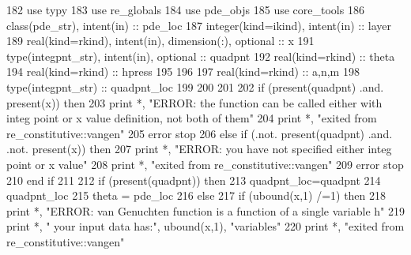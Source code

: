 \begin{DoxyCode}
182       \textcolor{keywordtype}{use }typy
183       \textcolor{keywordtype}{use }re_globals
184       \textcolor{keywordtype}{use }pde_objs
185       \textcolor{keywordtype}{use }core_tools
186       \textcolor{keywordtype}{class}(pde_str), \textcolor{keywordtype}{intent(in)} :: pde\_loc
187       \textcolor{keywordtype}{integer(kind=ikind)}, \textcolor{keywordtype}{intent(in)} :: layer
189       \textcolor{keywordtype}{real(kind=rkind)}, \textcolor{keywordtype}{intent(in)}, \textcolor{keywordtype}{dimension(:)}, \textcolor{keywordtype}{optional} :: x
191       \textcolor{keywordtype}{type}(integpnt_str), \textcolor{keywordtype}{intent(in)}, \textcolor{keywordtype}{optional} :: quadpnt
192       \textcolor{keywordtype}{real(kind=rkind)} :: theta
194       \textcolor{keywordtype}{real(kind=rkind)} :: hpress
195       
196       
197       \textcolor{keywordtype}{real(kind=rkind)} :: a,n,m
198       \textcolor{keywordtype}{type}(integpnt_str) :: quadpnt\_loc
199       
200  
201 
202       \textcolor{keywordflow}{if} (\textcolor{keyword}{present}(quadpnt) .and. \textcolor{keyword}{present}(x)) \textcolor{keywordflow}{then}
203         print *, \textcolor{stringliteral}{"ERROR: the function can be called either with integ point or x value definition, not both
       of them"}
204         print *, \textcolor{stringliteral}{"exited from re\_constitutive::vangen"}
205         error stop
206       \textcolor{keywordflow}{else} \textcolor{keywordflow}{if} (.not. \textcolor{keyword}{present}(quadpnt) .and. .not. \textcolor{keyword}{present}(x)) \textcolor{keywordflow}{then}
207         print *, \textcolor{stringliteral}{"ERROR: you have not specified either integ point or x value"}
208         print *, \textcolor{stringliteral}{"exited from re\_constitutive::vangen"}
209         error stop
210 \textcolor{keywordflow}{      end if}
211       
212       \textcolor{keywordflow}{if} (\textcolor{keyword}{present}(quadpnt)) \textcolor{keywordflow}{then}
213         quadpnt\_loc=quadpnt
214         quadpnt\_loc%
215         theta = pde\_loc%
216       \textcolor{keywordflow}{else}
217         \textcolor{keywordflow}{if} (ubound(x,1) /=1) \textcolor{keywordflow}{then}
218           print *, \textcolor{stringliteral}{"ERROR: van Genuchten function is a function of a single variable h"}
219           print *, \textcolor{stringliteral}{"       your input data has:"}, ubound(x,1), \textcolor{stringliteral}{"variables"}
220           print *, \textcolor{stringliteral}{"exited from re\_constitutive::vangen"}

\end{DoxyCode}
